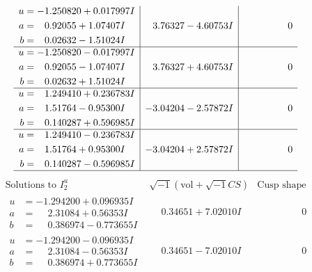 \documentclass[1p]{elsarticle_modified}
\theoremstyle{definition}
\newcommand{\I}{\sqrt{-1}}
\begin{document}
$$\begin{array}{c|c|c}
\begin{aligned}
u &= -1.250820 + 0.017997 I \\
a &= \phantom{-}0.92055 + 1.07407 I \\
b &= \phantom{-}0.02632 - 1.51024 I\end{aligned}
 & \phantom{-}3.76327 - 4.60753 I & \phantom{-0.000000 } 0 \\ \hline\begin{aligned}
u &= -1.250820 - 0.017997 I \\
a &= \phantom{-}0.92055 - 1.07407 I \\
b &= \phantom{-}0.02632 + 1.51024 I\end{aligned}
 & \phantom{-}3.76327 + 4.60753 I & \phantom{-0.000000 } 0 \\ \hline\begin{aligned}
u &= \phantom{-}1.249410 + 0.236783 I \\
a &= \phantom{-}1.51764 - 0.95300 I \\
b &= \phantom{-}0.140287 + 0.596985 I\end{aligned}
 & -3.04204 - 2.57872 I & \phantom{-0.000000 } 0 \\ \hline\begin{aligned}
u &= \phantom{-}1.249410 - 0.236783 I \\
a &= \phantom{-}1.51764 + 0.95300 I \\
b &= \phantom{-}0.140287 - 0.596985 I\end{aligned}
 & -3.04204 + 2.57872 I & \phantom{-0.000000 } 0\\
 \hline 
 \end{array}$$\newpage$$\begin{array}{c|c|c}  
\text{Solutions to }I^u_{2}& \I (\text{vol} + \sqrt{-1}CS) & \text{Cusp shape}\\
 \hline 
\begin{aligned}
u &= -1.294200 + 0.096935 I \\
a &= \phantom{-}2.31084 + 0.56353 I \\
b &= \phantom{-}0.386974 - 0.773655 I\end{aligned}
 & \phantom{-}0.34651 + 7.02010 I & \phantom{-0.000000 } 0 \\ \hline\begin{aligned}
u &= -1.294200 - 0.096935 I \\
a &= \phantom{-}2.31084 - 0.56353 I \\
b &= \phantom{-}0.386974 + 0.773655 I\end{aligned}
 & \phantom{-}0.34651 - 7.02010 I & \phantom{-0.000000 } 0 \\ \hline\begin{aligned}

\end{aligned}
\end{array}$$
\end{document}

